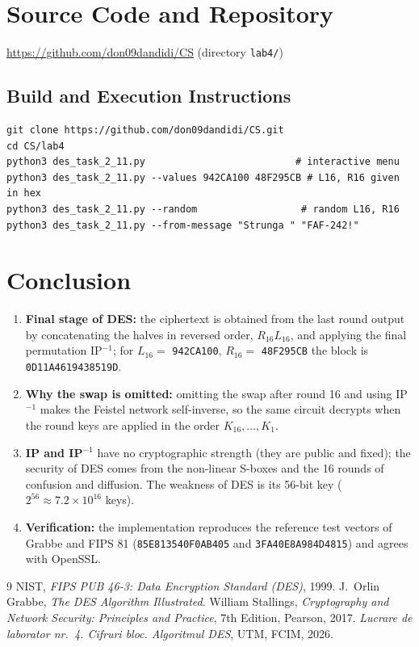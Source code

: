 \documentclass[12pt,a4paper]{article}
\begin{document}
\section{Source Code and Repository}
\begin{center}
\url{https://github.com/don09dandidi/CS} \quad (directory \texttt{lab4/})
\end{center}

\subsection{Build and Execution Instructions}
\begin{lstlisting}[style=sh]
git clone https://github.com/don09dandidi/CS.git
cd CS/lab4
python3 des_task_2_11.py                          # interactive menu
python3 des_task_2_11.py --values 942CA100 48F295CB # L16, R16 given in hex
python3 des_task_2_11.py --random                  # random L16, R16
python3 des_task_2_11.py --from-message "Strunga " "FAF-242!"
\end{lstlisting}

\section{Conclusion}
\begin{enumerate}
  \item \textbf{Final stage of DES:} the ciphertext is obtained from the last round output by
        concatenating the halves in reversed order, $R_{16}L_{16}$, and applying the final
        permutation IP$^{-1}$; for $L_{16}=$ \texttt{942CA100}, $R_{16}=$ \texttt{48F295CB} the
        block is \texttt{0D11A4619438519D}.
  \item \textbf{Why the swap is omitted:} omitting the swap after round 16 and using IP$^{-1}$ makes
        the Feistel network self-inverse, so the same circuit decrypts when the round keys are
        applied in the order $K_{16},\dots,K_1$.
  \item \textbf{IP and IP$^{-1}$} have no cryptographic strength (they are public and fixed); the
        security of DES comes from the non-linear S-boxes and the 16 rounds of confusion and
        diffusion. The weakness of DES is its 56-bit key ($2^{56}\approx7.2\times10^{16}$ keys).
  \item \textbf{Verification:} the implementation reproduces the reference test vectors
        of Grabbe and FIPS 81 (\texttt{85E813540F0AB405} and
        \texttt{3FA40E8A984D4815}) and agrees with OpenSSL.
\end{enumerate}

\begin{thebibliography}{9}
 NIST, \emph{FIPS PUB 46-3: Data Encryption Standard (DES)}, 1999.
 J.\ Orlin Grabbe, \emph{The DES Algorithm Illustrated}.
 William Stallings, \emph{Cryptography and Network Security: Principles and
  Practice}, 7th Edition, Pearson, 2017.
 \emph{Lucrare de laborator nr.~4. Cifruri bloc. Algoritmul DES}, UTM, FCIM, 2026.
\end{thebibliography}
\end{document}
